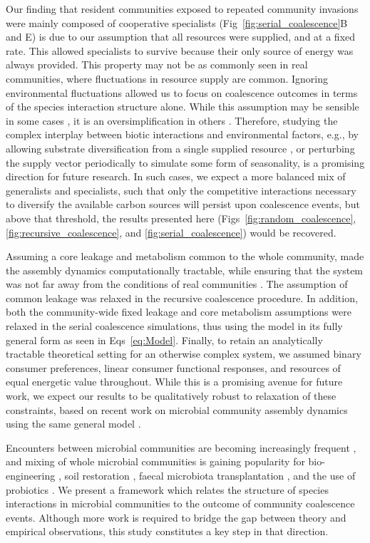 \documentclass[10pt,letterpaper]{article}
\begin{document}
Our finding that resident communities exposed to repeated community invasions were mainly composed of cooperative specialists (Fig~\ref{fig:serial_coalescence}B and E) is due to our assumption that all resources were supplied, and at a fixed rate. This allowed  specialists to survive because their only source of energy was always provided. This property may not be as commonly seen in real communities, where fluctuations in resource supply are common. Ignoring environmental fluctuations allowed us to focus on coalescence outcomes in terms of the species interaction structure alone. While this assumption may be sensible in some cases \cite{Acosta2015}, it is an oversimplification in others \cite{Albright2020}. Therefore, studying the complex interplay between biotic interactions and environmental factors, e.g., by allowing substrate diversification from a single supplied resource \cite{Goldford2018, Marsland2019}, or perturbing the supply vector periodically to simulate some form of seasonality, is a promising direction for future research. In such cases, we expect a more balanced mix of generalists and specialists, such that only the competitive interactions necessary to diversify the available carbon sources will persist upon coalescence events, but above that threshold, the results presented here (Figs~\ref{fig:random_coalescence}, \ref{fig:recursive_coalescence}, and \ref{fig:serial_coalescence}) would be recovered. 

Assuming a core leakage and metabolism common to the whole community, made the assembly dynamics computationally tractable, while ensuring that the system was not far away from the conditions of real communities \cite{Marsland2019, Marsland2020}. The assumption of common leakage was relaxed in the recursive coalescence procedure. In addition, both the community-wide fixed leakage and core metabolism assumptions were relaxed in the serial coalescence simulations, thus using the model in its fully general form as seen in Eqs~\ref{eq:Model}. Finally, to retain an analytically tractable theoretical setting for an otherwise complex system, we assumed binary consumer preferences, linear consumer functional responses, and resources of equal energetic value throughout. While this is a promising avenue for future work, we expect our results to be qualitatively robust to relaxation of these constraints, based on recent work on microbial community assembly dynamics using the same general model \cite{Marsland2019, Marsland2020}.

Encounters between microbial communities are becoming increasingly frequent \cite{Seebens2017}, and mixing of whole microbial communities is gaining popularity for bio-engineering \cite{Rillig2016}, soil restoration \cite{Calderon2017}, faecal microbiota transplantation \cite{Wang2019, Wilson2019}, and the use of probiotics \cite{Lindemann2016}. We present a framework which relates the structure of species interactions in microbial communities to the outcome of community coalescence events. Although more work is required to bridge the gap between theory and empirical observations, this study constitutes a key step in that direction.
\end{document}
